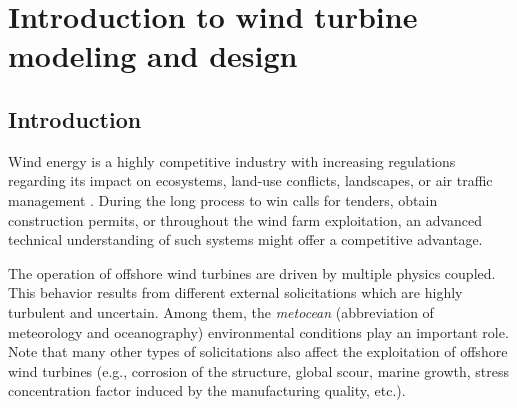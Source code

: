 \chapter{Introduction to wind turbine modeling and design}
\label{chpt:2}
\hfill
\localtableofcontents
\newpage







\section{Introduction}

Wind energy is a highly competitive industry with increasing regulations regarding its impact on ecosystems, land-use conflicts, landscapes, or air traffic management \citep{eolien_en_mer_2022}. 
During the long process to win calls for tenders, obtain construction permits, or throughout the wind farm exploitation, an advanced technical understanding of such systems might offer a competitive advantage. 

The operation of offshore wind turbines are driven by multiple physics coupled. 
This behavior results from different external solicitations which are highly turbulent and uncertain. 
Among them, the \textit{metocean} (abbreviation of meteorology and oceanography) environmental conditions play an important role. 
Note that many other types of solicitations also affect the exploitation of offshore wind turbines (e.g., corrosion of the structure, global scour, marine growth, stress concentration factor induced by the manufacturing quality, etc.). 

